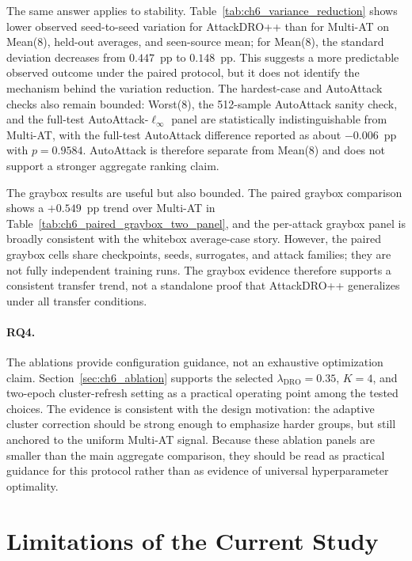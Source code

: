 The same answer applies to stability.  Table~\ref{tab:ch6_variance_reduction}
shows lower observed seed-to-seed variation for AttackDRO++ than for Multi-AT on
Mean(8), held-out averages, and seen-source mean; for Mean(8), the standard
deviation decreases from $0.447$~pp to $0.148$~pp.  This suggests a more
predictable observed outcome under the paired protocol, but it does not identify
the mechanism behind the variation reduction.  The hardest-case and AutoAttack checks also remain
bounded: Worst(8), the 512-sample AutoAttack sanity check, and the full-test
AutoAttack-$\ell_\infty$ panel are statistically indistinguishable from
Multi-AT, with the full-test AutoAttack difference reported as about
$-0.006$~pp with $p=0.9584$.  AutoAttack is therefore separate from Mean(8) and
does not support a stronger aggregate ranking claim.

The graybox results are useful but also bounded.  The paired graybox comparison
shows a $+0.549$~pp trend over Multi-AT in
Table~\ref{tab:ch6_paired_graybox_two_panel}, and the per-attack graybox panel
is broadly consistent with the whitebox average-case story.  However, the
paired graybox cells share checkpoints, seeds, surrogates, and attack families;
they are not fully independent training runs.  The graybox evidence therefore
supports a consistent transfer trend, not a standalone proof that AttackDRO++
generalizes under all transfer conditions.

\paragraph{RQ4.}
The ablations provide configuration guidance, not an exhaustive optimization
claim.  Section~\ref{sec:ch6_ablation} supports the selected
$\lambda_{\mathrm{DRO}}=0.35$, $K=4$, and two-epoch cluster-refresh setting as a
practical operating point among the tested choices.  The evidence is consistent
with the design motivation: the adaptive cluster correction should be strong
enough to emphasize harder groups, but still anchored to the uniform Multi-AT
signal.  Because these ablation panels are smaller than the main aggregate
comparison, they should be read as practical guidance for this protocol rather
than as evidence of universal hyperparameter optimality.

\section{Limitations of the Current Study}

